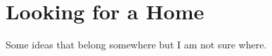 \chapter{Looking for a Home}
\label{app:LookingForaHome}

Some ideas that belong somewhere but I am not sure where.
